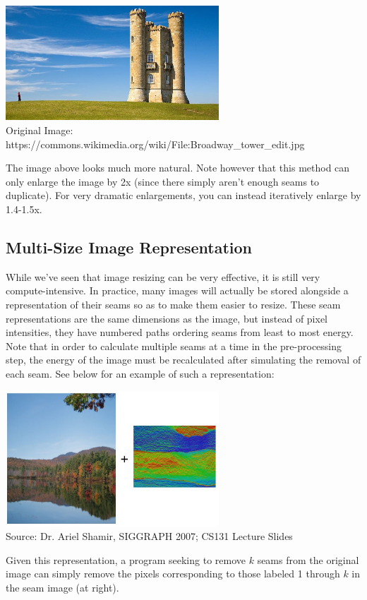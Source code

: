 \documentclass{article}
\begin{document}
\begin{center}
\includegraphics[width=8cm]{Smart_Resizing.jpg} \\
Original Image: https://commons.wikimedia.org/wiki/File:Broadway\_tower\_edit.jpg
\end{center}
The image above looks much more natural. Note however that this method can only enlarge the image by 2x (since there simply aren't enough seams to duplicate). For very dramatic enlargements, you can instead iteratively enlarge by 1.4-1.5x.

\subsection{Multi-Size Image Representation}
While we've seen that image resizing can be very effective, it is still very compute-intensive. In practice, many images will actually be stored alongside a representation of their seams so as to make them easier to resize. These seam representations are the same dimensions as the image, but instead of pixel intensities, they have numbered paths ordering seams from least to most energy. Note that in order to calculate multiple seams at a time in the pre-processing step, the energy of the image must be recalculated after simulating the removal of each seam. See below for an example of such a representation:
\begin{center}
\includegraphics[width=8cm]{resizing_representation.JPG} \\
Source: Dr. Ariel Shamir, SIGGRAPH 2007; CS131 Lecture Slides
\end{center}
Given this representation, a program seeking to remove $k$ seams from the original image can simply remove the pixels corresponding to those labeled 1 through $k$ in the seam image (at right).
\end{document}
